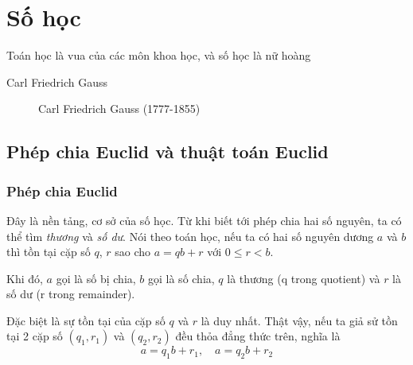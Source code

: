 \chapter{Số học}

\epigraph{{\rmfamily Toán học là vua của các môn khoa học, và số học là nữ hoàng}}{Carl Friedrich Gauss}

\begin{figure}[ht]
    \centering
    \captionsetup{labelformat=empty}
    \caption{Carl Friedrich Gauss (1777-1855)}
\end{figure}

\section{Phép chia Euclid và thuật toán Euclid}

\subsection*{Phép chia Euclid}

Đây là nền tảng, cơ sở của số học. Từ khi biết tới phép chia hai số nguyên, ta có thể tìm \textit{thương} và \textit{số dư}. Nói theo toán học, nếu ta có hai số nguyên dương $a$ và $b$ thì tồn tại cặp số $q$, $r$ sao cho $a = qb + r$ với $0 \leqslant r < b$.

Khi đó, $a$ gọi là số bị chia, $b$ gọi là số chia, $q$ là thương (q trong quotient) và $r$ là số dư (r trong remainder).

Đặc biệt là sự tồn tại của cặp số $q$ và $r$ là duy nhất. Thật vậy, nếu ta giả sử tồn tại 2 cặp số $(q_1, r_1)$ và $(q_2, r_2)$  đều thỏa đẳng thức trên, nghĩa là
\[a = q_1 b + r_1, \quad a = q_2 b + r_2\]

